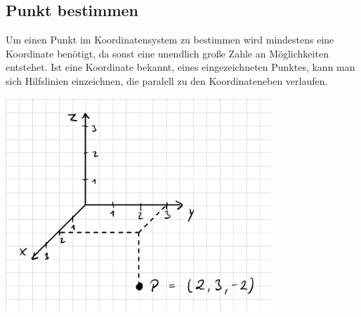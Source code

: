 \subsection{Punkt bestimmen}
Um einen Punkt im Koordinatensystem zu bestimmen wird mindestens eine Koordinate benötigt, da sonst eine unendlich große Zahle an Möglichkeiten entstehet. Ist eine Koordinate bekannt, eines eingezeichneten Punktes, kann man sich Hilfslinien einzeichnen, die paralell zu den Koordinateneben verlaufen. 

\includegraphics[width=10cm]{Media/punktablesen3dKoordinatensystem.jpg}